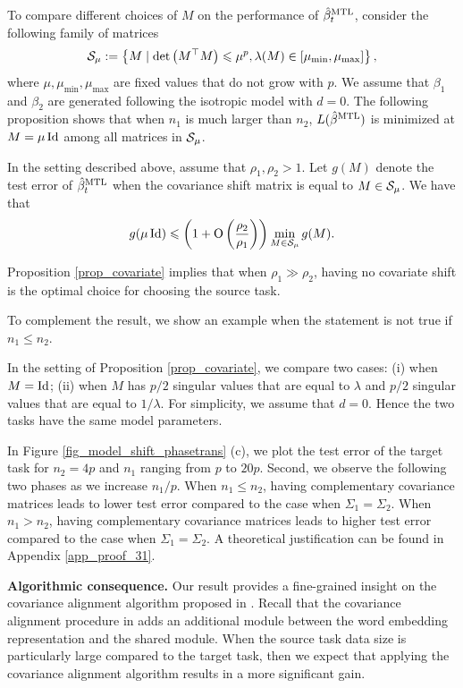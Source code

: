 	To compare different choices of $M$ on the performance of $\hat{\beta}_t^{\text{MTL}}$, consider the following family of matrices
	\begin{align*}
		\mathcal{S}_{\mu}:=\left\{ M \mid \det\left({ M^\top M}\right) \leqslant \mu^p, \lambda(M) \in [\mu_{\min}, \mu_{\max}] \right\},
	\end{align*}
	where $\mu, \mu_{\min}, \mu_{\max}$ are fixed values that do not grow with $p$.
	We assume that $\beta_1$ and $\beta_2$ are generated following the isotropic model with $d = 0$.
	The following proposition shows that when $n_1$ is much larger than $n_2$, $L(\hat{\beta}^{\text{MTL}})$ is minimized at $M = \mu\operatorname{Id}$ among all matrices in $\mathcal{S}_{\mu}$.

\begin{proposition}\label{prop_covariate}
	In the setting described above, assume that $\rho_1, \rho_2>1$.
	Let $g(M)$ denote the test error of $\hat{\beta}_t^{\text{MTL}}$ when the covariance shift matrix is equal to $M\in\mathcal{S}_{\mu}$.
	We have that \[ g(\mu\operatorname{Id}) \leqslant \left({1+ \operatorname{O}\left(\frac{\rho_2}{\rho_1}  \right)}\right) \min_{M\in\mathcal{S}_{\mu}} g(M). \]
\end{proposition}
Proposition \ref{prop_covariate} implies that when $\rho_1\gg \rho_2$, having no covariate shift is the optimal choice for choosing the source task.

\todo{} To complement the result, we show an example when the statement is not true if $n_1 \le n_2$.
\begin{example}\label{ex_complement}
	In the setting of Proposition \ref{prop_covariate}, we compare two cases: (i) when $M = \operatorname{Id}$; (ii) when $M$ has $p/2$ singular values that are equal to $\lambda$ and $p/2$ singular values that are equal to $1 / \lambda$.
	For simplicity, we assume that $d = 0$.
	Hence the two tasks have the same model parameters.

	In Figure \ref{fig_model_shift_phasetrans} (c), we plot the test error of the target task for $n_2 = 4p$ and $n_1$ ranging from $p$ to $20p$.
	Second, we observe the following two phases as we increase $n_1 / p$.
	When $n_1 \le n_2$, having complementary covariance matrices leads to lower test error compared to the case when $\Sigma_1 = \Sigma_2$.
	When $n_1 > n_2$, having complementary covariance matrices leads to higher test error compared to the case when $\Sigma_1 = \Sigma_2$.
	A theoretical justification can be found in Appendix \ref{app_proof_31}.
\end{example}

\textbf{Algorithmic consequence.}
Our result provides a fine-grained insight on the covariance alignment algorithm proposed in \cite{WZR20}.
Recall that the covariance alignment procedure in \cite{WZR20} adds an additional module between the word embedding representation and the shared module.
When the source task data size is particularly large compared to the target task, then we expect that applying the covariance alignment algorithm results in a more significant gain.